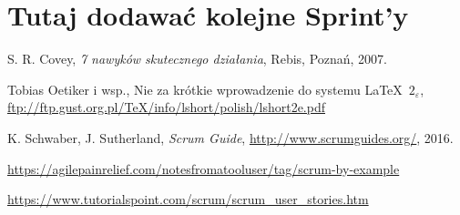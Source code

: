\documentclass[a4paper]{article}
\begin{document}
\section*{Tutaj dodawać kolejne Sprint'y}


\begin{thebibliography}{9}

 S. R. Covey, {\em 7 nawyków skutecznego działania}, Rebis, Poznań, 2007.

 Tobias Oetiker i wsp., Nie za krótkie wprowadzenie do systemu \LaTeX  \ $2_\varepsilon$, \url{ftp://ftp.gust.org.pl/TeX/info/lshort/polish/lshort2e.pdf}

 K. Schwaber, J. Sutherland, {\em Scrum Guide}, \url{http://www.scrumguides.org/}, 2016.

 \url{https://agilepainrelief.com/notesfromatooluser/tag/scrum-by-example}

 \url{https://www.tutorialspoint.com/scrum/scrum_user_stories.htm}

\end{thebibliography}
\end{document}
